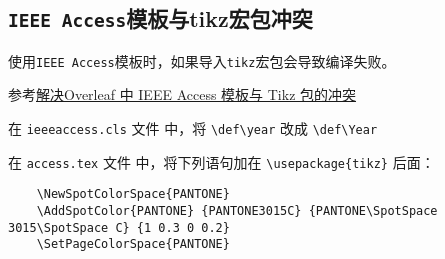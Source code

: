 \subsection{\lstinline{IEEE Access}模板与tikz宏包冲突}\label{subsec:figure-ieeeaccess}
使用\lstinline{IEEE Access}模板时，如果导入\lstinline{tikz}宏包会导致编译失败。

参考\href{https://www.cnblogs.com/greatestchen/p/17006317.html}{解决Overleaf 中 IEEE Access 模板与 Tikz 包的冲突}

在 \lstinline|ieeeaccess.cls| 文件 中，将 \lstinline|\def\year| 改成 \lstinline|\def\Year|

在 \lstinline|access.tex| 文件 中，将下列语句加在 \lstinline|\usepackage{tikz}| 后面：
\begin{lstlisting}
    \NewSpotColorSpace{PANTONE}
    \AddSpotColor{PANTONE} {PANTONE3015C} {PANTONE\SpotSpace 3015\SpotSpace C} {1 0.3 0 0.2}
    \SetPageColorSpace{PANTONE}
\end{lstlisting}  